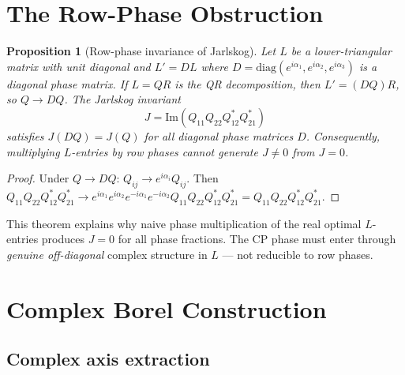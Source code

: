 \documentclass[floatfix,aps,prd,twocolumn,showpacs,superscriptaddress,longbibliography]{revtex4-2}
\newtheorem{proposition}{Proposition}
\begin{document}
\section{The Row-Phase Obstruction}
\label{sec:obstruction}

\begin{proposition}[Row-phase invariance of Jarlskog]
\label{prop:rowphase}
Let $L$ be a lower-triangular matrix with unit diagonal and
$L' = DL$ where $D = \mathrm{diag}(e^{i\alpha_1}, e^{i\alpha_2},
e^{i\alpha_3})$ is a diagonal phase matrix.
If $L = QR$ is the QR decomposition, then $L' = (DQ)R$,
so $Q \to DQ$. The Jarlskog invariant
\begin{equation}
J = \mathrm{Im}(Q_{11}Q_{22}Q_{12}^* Q_{21}^*)
\end{equation}
satisfies $J(DQ) = J(Q)$ for all diagonal phase matrices $D$.
Consequently, multiplying $L$-entries by row phases cannot
generate $J \neq 0$ from $J = 0$.
\end{proposition}

\begin{proof}
Under $Q \to DQ$: $Q_{ij} \to e^{i\alpha_i}Q_{ij}$.
Then $Q_{11}Q_{22}Q_{12}^*Q_{21}^* \to
e^{i\alpha_1}e^{i\alpha_2}e^{-i\alpha_1}e^{-i\alpha_2}
Q_{11}Q_{22}Q_{12}^*Q_{21}^* = Q_{11}Q_{22}Q_{12}^*Q_{21}^*$.
\end{proof}

This theorem explains why naive phase multiplication of the real
optimal $L$-entries produces $J = 0$ for all phase fractions.
The CP phase must enter through \emph{genuine off-diagonal} complex
structure in $L$ — not reducible to row phases.

\section{Complex Borel Construction}
\label{sec:complex}

\subsection{Complex axis extraction}
\end{document}
